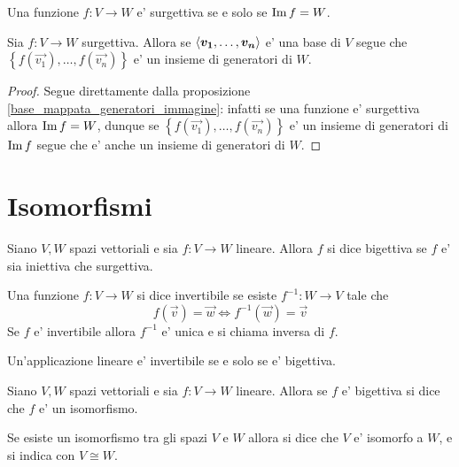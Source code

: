 \begin{remark}
    Una funzione $f : V \to W$ e' surgettiva se e solo se $\operatorname{Im}f = W$.
\end{remark}

\begin{corollary}\label{base_mappata_generatori_codominio}
    Sia $f : V \to W$ surgettiva. Allora se $\left\langle \bm{v_1}, \dots, \bm{v_n} \right\rangle$ e' una base di $V$ segue che $\left\{ f(\vec{v_1}), \dots, f(\vec{v_n})\right\}$ e' un insieme di generatori di $W$.
\end{corollary}
\begin{proof}
    Segue direttamente dalla proposizione \ref{base_mappata_generatori_immagine}: infatti se una funzione e' surgettiva allora $\operatorname{Im}f = W$, dunque se $\left\{ f(\vec{v_1}), \dots, f(\vec{v_n})\right\}$ e' un insieme di generatori di $\operatorname{Im}f$ segue che e' anche un insieme di generatori di $W$.
\end{proof}

\section{Isomorfismi}

\begin{definition}
    Siano $V, W$ spazi vettoriali e sia $f : V \to W$ lineare. Allora $f$ si dice bigettiva se $f$ e' sia iniettiva che surgettiva.
\end{definition}

\begin{definition}
    Una funzione $f : V \to W$ si dice invertibile se esiste $f^{-1} : W \to V$ tale che \begin{equation}
        f(\vec{v}) = \vec{w} \iff f^{-1}(\vec{w}) = \vec{v}
    \end{equation}
    Se $f$ e' invertibile allora $f^{-1}$ e' unica e si chiama inversa di $f$.
\end{definition}

\begin{remark}
    Un'applicazione lineare e' invertibile se e solo se e' bigettiva. 
\end{remark}

\begin{definition}[Isomorfismo]
    Siano $V, W$ spazi vettoriali e sia $f : V \to W$ lineare. Allora se $f$ e' bigettiva si dice che $f$ e' un isomorfismo.
    
    Se esiste un isomorfismo tra gli spazi $V$ e $W$ allora si dice che $V$ e' isomorfo a $W$, e si indica con $V \cong W$.
\end{definition}

